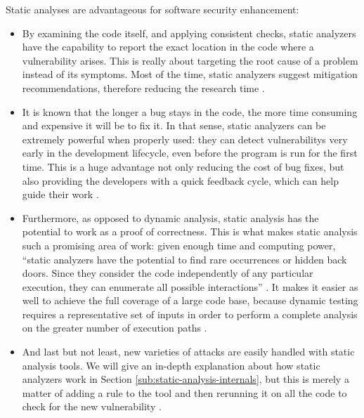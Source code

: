 Static analyses are advantageous for software security enhancement:

\begin{itemize}
    \item[\textcolor{custom-green}{\ding{51}}] By examining the code itself, and applying consistent checks, static analyzers have the capability to report the exact location in the code where a \gls{vulnerability} arises. This is really about targeting the root cause of a problem instead of its symptoms. Most of the time, static analyzers suggest mitigation recommendations, therefore reducing the research time \cite{anderson2008use,black2009static,chess2007secure}.
    \item[\textcolor{custom-green}{\ding{51}}] It is known that the longer a bug stays in the code, the more time consuming and expensive it will be to fix it. In that sense, static analyzers can be extremely powerful when properly used: they can detect \glspl{vulnerability} very early in the development lifecycle, even before the program is run for the first time. This is a huge advantage not only reducing the cost of bug fixes, but also providing the developers with a quick feedback cycle, which can help guide their work \cite{anderson2008use,black2009static,chess2007secure}.
    \item[\textcolor{custom-green}{\ding{51}}] Furthermore, as opposed to dynamic analysis, static analysis has the potential to work as a proof of correctness. This is what makes static analysis such a promising area of work: given enough time and computing power, ``static analyzers have the potential to find rare occurrences or hidden back doors. Since they consider the code independently of any particular execution, they can enumerate all possible interactions'' \cite{black2009static}. It makes it easier as well to achieve the full coverage of a large code base, because dynamic testing requires a representative set of inputs in order to perform a complete analysis on the greater number of execution paths \cite{anderson2008use,black2009static,chess2007secure,ernst2003static}.
    \item[\textcolor{custom-green}{\ding{51}}] And last but not least, new varieties of attacks are easily handled with static analysis tools. We will give an in-depth explanation about how static analyzers work in Section \ref{sub:static-analysis-internals}, but this is merely a matter of adding a rule to the tool and then rerunning it on all the code to check for the new \gls{vulnerability} \cite{anderson2008use,black2009static,chess2007secure}.
\end{itemize}

